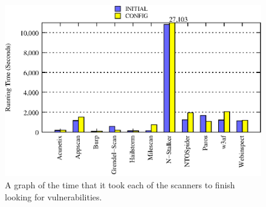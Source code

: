 \begin{figure}[tb]
      \includegraphics[scale=1]{running_time_graph}
      \caption[Scanner running times.]{A graph of the time that it
        took each of the scanners to finish looking for vulnerabilities.}
\end{figure}

